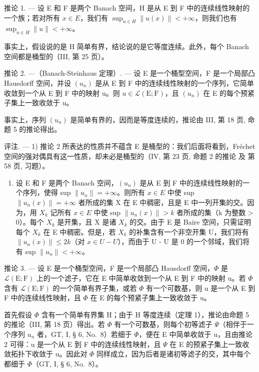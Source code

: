推论 1. --- 设 E 和 F 是两个 Banach 空间，H 是从 E 到 F 中的连续线性映射的一个族；若对所有 \(x \in E\)，我们有 \(\sup_{u \in H} \|u(x)\| < +\infty\)，则我们也有 \(\sup_{u \in H} \|u\| < +\infty\)。

事实上，假设说的是 H 简单有界，结论说的是它等度连续。此外，每个 Banach 空间都是桶型的（III, 第 25 页）。

推论 2. ---（Banach-Steinhaus 定理）. --- 设 E 是一个桶型空间，F 是一个局部凸 Hausdorff 空间，并设 \((u_n)\) 是从 E 到 F 中的连续线性映射的一个序列，它简单收敛到一个从 E 到 F 中的映射 u。则 \(u \in \mathcal{L}(\mathrm{E}; \mathrm{F})\)，且 \((u_{n})\) 在 E 的每个预紧子集上一致收敛于 u。

事实上，序列 \((u_{n})\) 是简单有界的，因而是等度连续的，推论由 III, 第 18 页, 命题 5 的推论得出。

评注. --- 1) 推论 2 所表达的性质并不蕴含 E 是桶型的：我们后面将看到，Fréchet 空间的强对偶具有这一性质，却未必是桶型的（IV, 第 23 页, 命题 2 的推论 及 第 58 页, 习题）。

\begin{enumerate}
\def\labelenumi{\arabic{enumi})}
\setcounter{enumi}{1}
\tightlist
\item
  设 E 和 F 是两个 Banach 空间，\((u_{n})\) 是从 E 到 F 中的连续线性映射的一个序列，使得 sup \(\|u_{n}\| = +\infty\)。则所有 \(x \in E\) 中使 sup \(\|u_{n}(x)\| = +\infty\) 者所成的集 X 在 E 中稠密，且是 E 中一列开集的交。因为，用 \(X_{k}\) 记所有 \(x \in E\) 中使 sup \(\|u_{n}(x)\| > k\) 者所成的集（k 为整数 \textgreater{} 0）。每个 \(X_{k}\) 是开集，且 X 是诸 \(X_{k}\) 的交。由于 E 是 Baire 空间，只需证明每个 \(X_{k}\) 在 E 中稠密。但是，若 \(X_{k}\) 的补集含有一个非空开集 U，我们将有 \(\|u_{n}(x)\| \leqslant 2k\)（对 \(x \in U - U\)），而由于 U - U 是 0 的一个邻域，我们将有 sup \(\|u_{n}\| < +\infty\)。
\end{enumerate}

推论 3. --- 设 E 是一个桶型空间，F 是一个局部凸 Hausdorff 空间，\(\Phi\) 是 \(\mathcal{L}(\mathrm{E};\mathrm{F})\) 上的一个滤子，它在 E 中简单收敛到一个从 E 到 F 中的映射 u。若 \(\Phi\) 含有 \(\mathcal{L}(\mathrm{E};\mathrm{F})\) 的一个简单有界子集，或若 \(\Phi\) 有一个可数基，则 u 是一个从 E 到 F 中的连续线性映射，且 \(\Phi\) 在 E 的每个预紧子集上一致收敛于 u。

首先假设 \(\Phi\) 含有一个简单有界集 H；由于 H 等度连续（定理 1），推论由命题 5 的推论（III, 第 18 页）得出。若 \(\Phi\) 有一个可数基，则每个初等滤子 \(\Psi\)（相伴于一个序列 \(u_{n}\) 者，GT, I, § 6, No.~8）若细于 \(\Phi\)，便在 E 中简单收敛于 u，且由推论 2 可得：u 是一个从 E 到 F 中的连续线性映射，且 \(\Psi\) 在 E 的预紧子集上一致收敛拓扑下收敛于 u。因此对 \(\Phi\) 同样成立，因为后者是诸初等滤子的交，其中每个都细于 \(\Phi\)（GT, I, § 6, No.~8）。

